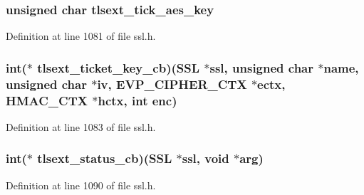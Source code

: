 \subsubsection[{\texorpdfstring{tlsext\+\_\+tick\+\_\+aes\+\_\+key}{tlsext_tick_aes_key}}]{\setlength{\rightskip}{0pt plus 5cm}unsigned char tlsext\+\_\+tick\+\_\+aes\+\_\+key}\hypertarget{structssl__ctx__st_af9722f587997ab60d353ef54772c75a7}{}\label{structssl__ctx__st_af9722f587997ab60d353ef54772c75a7}


Definition at line 1081 of file ssl.\+h.

\subsubsection[{\texorpdfstring{tlsext\+\_\+ticket\+\_\+key\+\_\+cb}{tlsext_ticket_key_cb}}]{\setlength{\rightskip}{0pt plus 5cm}int($\ast$ tlsext\+\_\+ticket\+\_\+key\+\_\+cb)({\bf S\+SL} $\ast$ssl, unsigned char $\ast$name, unsigned char $\ast$iv, {\bf E\+V\+P\+\_\+\+C\+I\+P\+H\+E\+R\+\_\+\+C\+TX} $\ast$ectx, {\bf H\+M\+A\+C\+\_\+\+C\+TX} $\ast$hctx, int enc)}\hypertarget{structssl__ctx__st_acf00005001fd1cc9fd19d5401cc41d6c}{}\label{structssl__ctx__st_acf00005001fd1cc9fd19d5401cc41d6c}


Definition at line 1083 of file ssl.\+h.

\subsubsection[{\texorpdfstring{tlsext\+\_\+status\+\_\+cb}{tlsext_status_cb}}]{\setlength{\rightskip}{0pt plus 5cm}int($\ast$ tlsext\+\_\+status\+\_\+cb)({\bf S\+SL} $\ast$ssl, {\bf void} $\ast$arg)}\hypertarget{structssl__ctx__st_ad4c6bfd6ad1b4929649d645cae3a8838}{}\label{structssl__ctx__st_ad4c6bfd6ad1b4929649d645cae3a8838}


Definition at line 1090 of file ssl.\+h.

